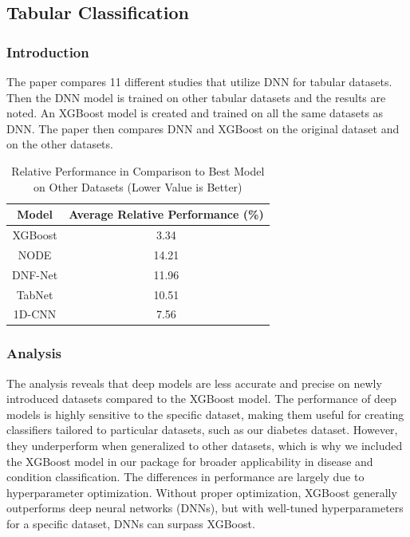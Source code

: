 \documentclass[conference]{IEEEtran}
\begin{document}
\subsection{Tabular Classification }
\subsubsection{Introduction}

The paper\cite{b7} compares 11 different studies that utilize DNN for tabular datasets. Then the DNN model is trained on other tabular datasets and the results are noted. An XGBoost model is created and trained on all the same datasets as DNN. The paper then compares DNN and XGBoost on the original dataset and on the other datasets.


\begin{table}[ht]
\caption{Relative Performance in Comparison to Best Model on Other Datasets (Lower Value is Better)}
\begin{center}
\begin{tabular}{|c|c|}
\hline
\textbf{Model} & \textbf{Average Relative Performance (\%)} \\
\hline
XGBoost & 3.34 \\
NODE & 14.21 \\
DNF-Net & 11.96 \\
TabNet & 10.51 \\
1D-CNN & 7.56 \\
\hline
\end{tabular}
\end{center}
\end{table}

\subsubsection{Analysis}
The analysis reveals that deep models are less accurate and precise on newly introduced datasets compared to the XGBoost model. The performance of deep models is highly sensitive to the specific dataset, making them useful for creating classifiers tailored to particular datasets, such as our diabetes dataset. However, they underperform when generalized to other datasets, which is why we included the XGBoost model in our package for broader applicability in disease and condition classification. The differences in performance are largely due to hyperparameter optimization. Without proper optimization, XGBoost generally outperforms deep neural networks (DNNs), but with well-tuned hyperparameters for a specific dataset, DNNs can surpass XGBoost.
\end{document}
